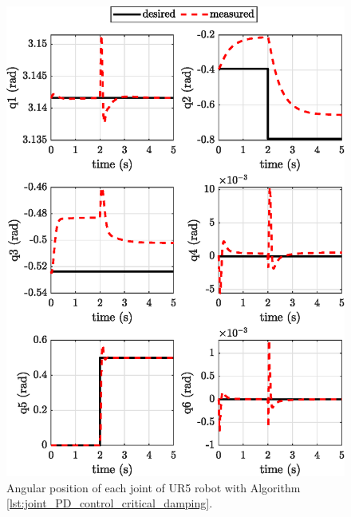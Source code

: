 \begin{figure}[H]
    \centering
    \includegraphics{images/act_1.5/joint_position.eps}
    \caption{Angular position of each joint of UR5 robot with Algorithm \ref{lst:joint_PD_control_critical_damping}.}
    \label{fig:act_1.5_joint_position}
\end{figure}

